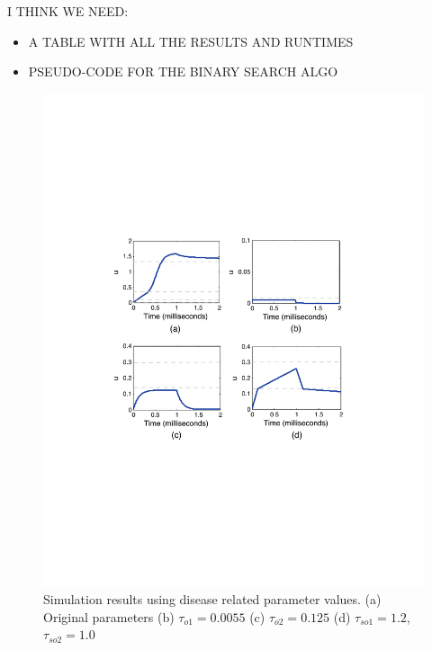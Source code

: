 I THINK WE NEED:
\begin{itemize}
	\item A TABLE WITH ALL THE RESULTS AND RUNTIMES
	\item PSEUDO-CODE FOR THE BINARY SEARCH ALGO
\end{itemize}


\begin{figure}[h]
\centering
\includegraphics[scale=0.6]{fig-cardiactraj2}
\caption{Simulation results using disease related parameter values. (a) Original parameters (b) $\tau_{o1}=0.0055$ (c) $\tau_{o2} = 0.125$ (d) $\tau_{so1} =1.2$, $\tau_{so2} =1.0$ }
\label{cresults}
\end{figure}

